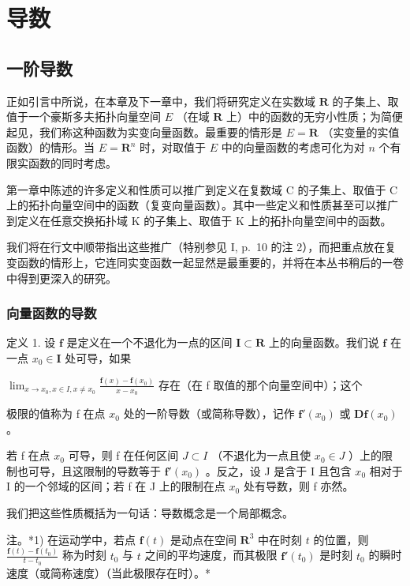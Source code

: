 \chapter{导数}

\section{一阶导数}

正如引言中所说，在本章及下一章中，我们将研究定义在实数域 \(\mathbf{R}\) 的子集上、取值于一个豪斯多夫拓扑向量空间 \(E\) （在域 \(\mathbf{R}\) 上）中的函数的无穷小性质；为简便起见，我们称这种函数为实变向量函数。最重要的情形是 \(E = \mathbf{R}\) （实变量的实值函数）的情形。当 \(E = \mathbf{R}^n\) 时，对取值于 \(E\) 中的向量函数的考虑可化为对 \(n\) 个有限实函数的同时考虑。

第一章中陈述的许多定义和性质可以推广到定义在复数域 C 的子集上、取值于 C 上的拓扑向量空间中的函数（复变向量函数）。其中一些定义和性质甚至可以推广到定义在任意交换拓扑域 K 的子集上、取值于 K 上的拓扑向量空间中的函数。

我们将在行文中顺带指出这些推广（特别参见 I, p.~10 的注 2），而把重点放在复变函数的情形上，它连同实变函数一起显然是最重要的，并将在本丛书稍后的一卷中得到更深入的研究。

\subsection{向量函数的导数}

定义 1. 设 \(\mathbf{f}\) 是定义在一个不退化为一点的区间 \(\mathbf{I} \subset \mathbf{R}\) 上的向量函数。我们说 \(\mathbf{f}\) 在一点 \(x_0 \in \mathbf{I}\) 处可导，如果

\(\lim_{x\to x_{0},x\in I,x\neq x_{0}}\frac{\mathbf{f}(x)-\mathbf{f}(x_{0})}{x-x_{0}}\) 存在（在 f 取值的那个向量空间中）；这个

极限的值称为 f 在点 \(x_{0}\) 处的一阶导数（或简称导数），记作 \(\mathbf{f}'(x_{0})\) 或 \(\mathbf{D}\mathbf{f}(x_{0})\) 。

若 f 在点 \(x_{0}\) 可导，则 f 在任何区间 \(J \subset I\) （不退化为一点且使 \(x_{0} \in J\) ）上的限制也可导，且这限制的导数等于 \(\mathbf{f}'(x_{0})\) 。反之，设 J 是含于 I 且包含 \(x_{0}\) 相对于 I 的一个邻域的区间；若 f 在 J 上的限制在点 \(x_{0}\) 处有导数，则 f 亦然。

我们把这些性质概括为一句话：导数概念是一个局部概念。

注。*1) 在运动学中，若点 \(\mathbf{f}(t)\) 是动点在空间 \(\mathbf{R}^3\) 中在时刻 \(t\) 的位置，则 \(\frac{\mathbf{f}(t) - \mathbf{f}(t_0)}{t - t_0}\) 称为时刻 \(t_0\) 与 \(t\) 之间的平均速度，而其极限 \(\mathbf{f}'(t_0)\) 是时刻 \(t_0\) 的瞬时速度（或简称速度）（当此极限存在时）。*

